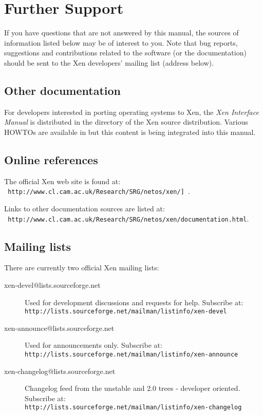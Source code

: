 \documentclass[11pt,twoside,final,openright]{xenstyle}
\begin{document}
{\chapter{Further Support}

If you have questions that are not answered by this manual, the
sources of information listed below may be of interest to you.  Note
that bug reports, suggestions and contributions related to the
software (or the documentation) should be sent to the Xen developers'
mailing list (address below).

\section{Other documentation}

For developers interested in porting operating systems to Xen, the
{\em Xen Interface Manual} is distributed in the 
directory of the Xen source distribution.  Various HOWTOs are
available in  but this content is being integrated
into this manual.

\section{Online references}

The official Xen web site is found at: \\
{\tt
http://www.cl.cam.ac.uk/Research/SRG/netos/xen/] }.

Links to other
documentation sources are listed at: \\ {\tt
http://www.cl.cam.ac.uk/Research/SRG/netos/xen/documentation.html}.

\section{Mailing lists}

There are currently two official Xen mailing lists:

\begin{description}
\item[xen-devel@lists.sourceforge.net] Used for development
discussions and requests for help.  Subscribe at: \\
{\tt http://lists.sourceforge.net/mailman/listinfo/xen-devel}
\item[xen-announce@lists.sourceforge.net] Used for announcements only.
Subscribe at: \\
{\tt http://lists.sourceforge.net/mailman/listinfo/xen-announce}
\item[xen-changelog@lists.sourceforge.net]  Changelog feed
from the unstable and 2.0 trees - developer oriented.  Subscribe at: \\
{\tt http://lists.sourceforge.net/mailman/listinfo/xen-changelog}
\end{description}

}
\end{document}
